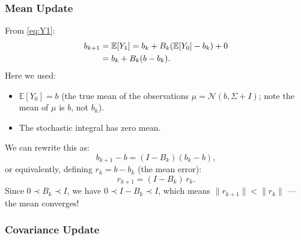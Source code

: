 \documentclass[11pt, a4paper]{article}
\theoremstyle{definition}
\begin{document}
\subsubsection{Mean Update}

\begin{calculation}[title={Deriving $b_{k+1}$}]
From \eqref{eq:Y1}:
\begin{align}
    b_{k+1} &= \mathbb{E}[Y_1] = b_k + B_k(\mathbb{E}[Y_0] - b_k) + 0 \notag \\
             &= b_k + B_k(b - b_k). \label{eq:mean_update}
\end{align}
Here we used:
\begin{itemize}
    \item $\mathbb{E}[Y_0] = b$ (the true mean of the observations $\mu = \mathcal{N}(b, \Sigma+I)$; note the mean of $\mu$ is $b$, not $b_k$).
    \item The stochastic integral has zero mean.
\end{itemize}

We can rewrite this as:
\[
    b_{k+1} - b = (I - B_k)(b_k - b),
\]
or equivalently, defining $r_k = b - b_k$ (the mean error):
\[
    \boxed{\;r_{k+1} = (I - B_k)\,r_k.\;}
\]
Since $0 \prec B_k \prec I$, we have $0 \prec I - B_k \prec I$, which means $\|r_{k+1}\| < \|r_k\|$ --- the mean converges!
\end{calculation}

\subsubsection{Covariance Update}
\end{document}
